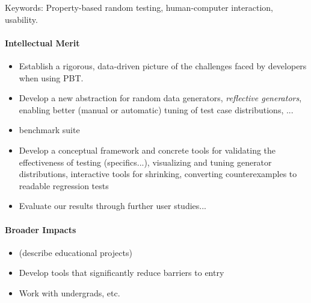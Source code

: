 Keywords: Property-based random testing, human-computer interaction,
usability.

\paragraph*{Intellectual Merit}
\begin{itemize}
\item Establish a rigorous, data-driven picture of the challenges
faced by developers when using PBT.
\item Develop a new abstraction for random data generators, {\em
  reflective generators}, enabling better (manual or automatic) tuning of test case
distributions, ...
\item benchmark suite
\item Develop a conceptual framework and concrete tools for validating
the effectiveness of testing (specifics...),
visualizing and tuning generator distributions,
interactive tools for shrinking,
converting counterexamples to readable regression tests
\item Evaluate our results through further user studies...
\end{itemize}

\paragraph*{Broader Impacts}
\begin{itemize}
\item (describe educational projects)
\item Develop tools that significantly reduce barriers to entry
\item Work with undergrads, etc.
\end{itemize}

